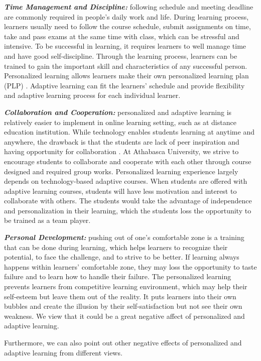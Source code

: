 \documentclass[english]{textolivre}
\begin{document}
\textbf{\emph{Time Management and Discipline:}} following schedule and meeting deadline are commonly required in people’s daily work and life. During learning process, learners usually need to follow the course schedule, submit assignments on time, take and pass exams at the same time with class, which can be stressful and intensive. To be successful in learning, it requires learners to well manage time and have good self-discipline. Through the learning process, learners can be trained to gain the important skill and characteristics of any successful person. Personalized learning allows learners make their own personalized learning plan (PLP) \cite{chang2010}. Adaptive learning can fit the learners’ schedule and provide flexibility and adaptive learning process for each individual learner.

\textbf{\emph{Collaboration and Cooperation:}} personalized and adaptive learning is relatively easier to implement in online learning setting, such as at distance education institution. While technology enables students learning at anytime and anywhere, the drawback is that the students are lack of peer inspiration and having opportunity for collaboration \cite{tan2010}. At Athabasca University, we strive to encourage students to collaborate and cooperate with each other through course designed and required group works. Personalized learning experience largely depends on technology-based adaptive courses. When students are offered with adaptive learning courses, students will have less motivation and interest to collaborate with others. The students would take the advantage of independence and personalization in their learning, which the students loss the opportunity to be trained as a team player.

\textbf{\emph{Personal Development:}} pushing out of one’s comfortable zone is a training that can be done during learning, which helps learners to recognize their potential, to face the challenge, and to strive to be better. If learning always happens within learners’ comfortable zone, they may loss the opportunity to taste failure and to learn how to handle their failure. The personalized learning prevents learners from competitive learning environment, which may help their self-esteem but leave them out of the reality. It puts learners into their own bubbles and create the illusion by their self-satisfaction but not see their own weakness. We view that it could be a great negative affect of personalized and adaptive learning.

Furthermore, we can also point out other negative effects of personalized and adaptive learning from different views.
\end{document}

